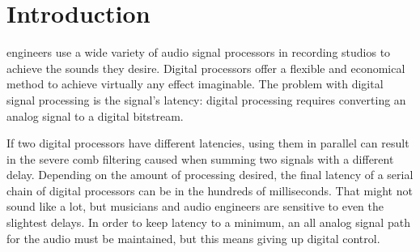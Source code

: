 \documentclass[journal]{IEEEtran}
\begin{document}
	
	
	
	
	
	\IEEEpeerreviewmaketitle
	
	
	
	\section{Introduction}
	
	  engineers use a wide variety of audio signal processors in recording studios to achieve the sounds
	they desire. Digital processors offer a flexible and economical method to achieve virtually any effect imaginable. The problem with digital signal processing is the signal’s latency: digital processing requires converting an analog signal to a digital bitstream.
	
	If two digital processors have different latencies, using them in parallel can result in the severe comb filtering caused when summing two signals with a different delay. Depending on the amount of processing desired, the final latency of a serial chain of digital processors can be in the hundreds of milliseconds. That might not sound like a lot, but musicians and audio engineers are sensitive to even the slightest delays. In order to keep latency to a minimum, an all analog signal path for the audio must be maintained, but this means giving up digital control. 
	
\end{document}
